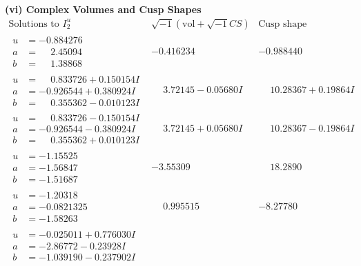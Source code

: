 \documentclass[1p]{elsarticle_modified}
\theoremstyle{definition}
\newcommand{\I}{\sqrt{-1}}
\begin{document}
\newpage\flushleft \textbf{(vi) Complex Volumes and Cusp Shapes}
$$\begin{array}{c|c|c}  
\text{Solutions to }I^u_{2}& \I (\text{vol} + \sqrt{-1}CS) & \text{Cusp shape}\\
 \hline 
\begin{aligned}
u &= -0.884276\phantom{ +0.000000I} \\
a &= \phantom{-}2.45094\phantom{ +0.000000I} \\
b &= \phantom{-}1.38868\phantom{ +0.000000I}\end{aligned}
 & -0.416234\phantom{ +0.000000I} & -0.988440\phantom{ +0.000000I} \\ \hline\begin{aligned}
u &= \phantom{-}0.833726 + 0.150154 I \\
a &= -0.926544 + 0.380924 I \\
b &= \phantom{-}0.355362 - 0.010123 I\end{aligned}
 & \phantom{-}3.72145 - 0.05680 I & \phantom{-}10.28367 + 0.19864 I \\ \hline\begin{aligned}
u &= \phantom{-}0.833726 - 0.150154 I \\
a &= -0.926544 - 0.380924 I \\
b &= \phantom{-}0.355362 + 0.010123 I\end{aligned}
 & \phantom{-}3.72145 + 0.05680 I & \phantom{-}10.28367 - 0.19864 I \\ \hline\begin{aligned}
u &= -1.15525\phantom{ +0.000000I} \\
a &= -1.56847\phantom{ +0.000000I} \\
b &= -1.51687\phantom{ +0.000000I}\end{aligned}
 & -3.55309\phantom{ +0.000000I} & \phantom{-}18.2890\phantom{ +0.000000I} \\ \hline\begin{aligned}
u &= -1.20318\phantom{ +0.000000I} \\
a &= -0.0821325\phantom{ +0.000000I} \\
b &= -1.58263\phantom{ +0.000000I}\end{aligned}
 & \phantom{-}0.995515\phantom{ +0.000000I} & -8.27780\phantom{ +0.000000I} \\ \hline\begin{aligned}
u &= -0.025011 + 0.776030 I \\
a &= -2.86772 - 0.23928 I \\
b &= -1.039190 - 0.237902 I\end{aligned}

\end{array}$$
\end{document}
